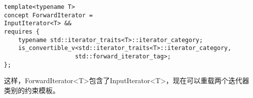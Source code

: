 \begin{lstlisting}[style=styleCXX]
template<typename T>
concept ForwardIterator =
InputIterator<T> &&
requires {
	typename std::iterator_traits<T>::iterator_category;
	is_convertible_v<std::iterator_traits<T>::iterator_category,
					std::forward_iterator_tag>;
};
\end{lstlisting}

这样，ForwardIterator<T>包含了InputIterator<T>，现在可以重载两个迭代器类别的约束模板。





















